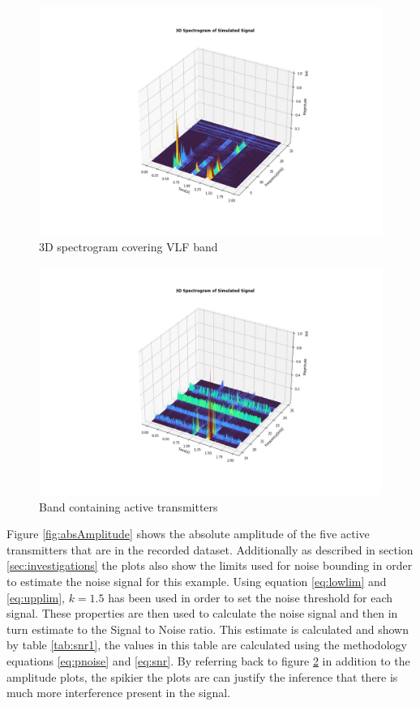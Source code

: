\begin{figure}[h!]
        \centering
        \includegraphics[width = \textwidth]{figs/sig_character/vlfspectrogram.png}
        \caption{3D spectrogram covering VLF band}
        \label{fig:vlfspect}
\end{figure}
\begin{figure}[h!]
        \centering
        \includegraphics[width = \textwidth]{figs/sig_character/transmitters_spectrogram.png}
        \caption{Band containing active transmitters}
        \label{fig:transSpect}
\end{figure}

Figure \ref{fig:absAmplitude} shows the absolute amplitude of the five active transmitters that are in the recorded dataset. Additionally as described in section \ref{sec:investigations} the plots also show the limits used for noise bounding in order to estimate the noise signal for this example. Using equation \ref{eq:lowlim} and \ref{eq:upplim}, $k=1.5$ has been used in order to set the noise threshold for each signal. These properties are then used to calculate the noise signal and then in turn estimate to the Signal to Noise ratio. This estimate is calculated and shown by table \ref{tab:snr1}, the values in this table are calculated using the methodology equations \ref{eq:pnoise} and \ref{eq:snr}. By referring back to figure \ref{fig:transSpect} in addition to the amplitude plots, the spikier the plots are can justify the inference that there is much more interference present in the signal. 

